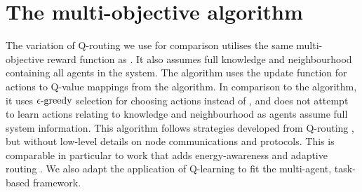 \section{The multi-objective \acronymBaseline{}{} algorithm}
\label{appendix:algorithm-qrouting}

\newcommand{\functionEGreedy}[2]{
	\functionSignature{\epsilon\text{-greedy}}{#1}
}

The variation of Q-routing we use for comparison utilises the same multi-objective reward function as \acronymWSNOptimisation{}{}. It also assumes full knowledge and neighbourhood containing all agents in the system. The algorithm uses the update function for actions to Q-value mappings from the \acronymATARIA{}{} algorithm. In comparison to the \acronymATARIA{}{} algorithm, it uses $\functionEGreedy{}{}$ selection for choosing actions instead of \acronymRewardTrendsAlgorithm{}{}, and does not attempt to learn actions relating to knowledge and neighbourhood as agents assume full system information. This algorithm follows strategies developed from Q-routing \citep{Boyan}, but without low-level details on node communications and protocols. This is comparable in particular to work that adds energy-awareness and adaptive routing \citep{Kiani2015, Wang2006, Khan2021}. We also adapt the application of Q-learning to fit the multi-agent, task-based framework.

